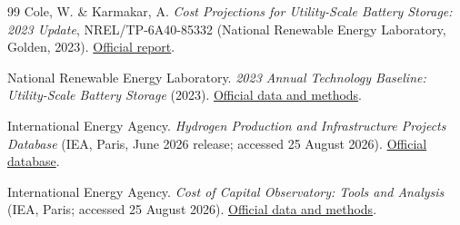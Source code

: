 \documentclass[pdflatex,sn-nature]{sn-jnl}
\begin{document}
\begin{thebibliography}{99}
Cole, W. \& Karmakar, A. \emph{Cost Projections for Utility-Scale Battery Storage: 2023 Update}, NREL/TP-6A40-85332 (National Renewable Energy Laboratory, Golden, 2023). \href{https://www.nrel.gov/docs/fy23osti/85332.pdf}{Official report}.

National Renewable Energy Laboratory. \emph{2023 Annual Technology Baseline: Utility-Scale Battery Storage} (2023). \href{https://atb.nrel.gov/Electricity/2023/2023/utility-scale_battery_storage}{Official data and methods}.

International Energy Agency. \emph{Hydrogen Production and Infrastructure Projects Database} (IEA, Paris, June 2026 release; accessed 25 August 2026). \href{https://www.iea.org/data-and-statistics/data-product/hydrogen-production-and-infrastructure-projects-database}{Official database}.

International Energy Agency. \emph{Cost of Capital Observatory: Tools and Analysis} (IEA, Paris; accessed 25 August 2026). \href{https://www.iea.org/reports/cost-of-capital-observatory/tools-and-analysis}{Official data and methods}.

\end{thebibliography}
\end{document}
